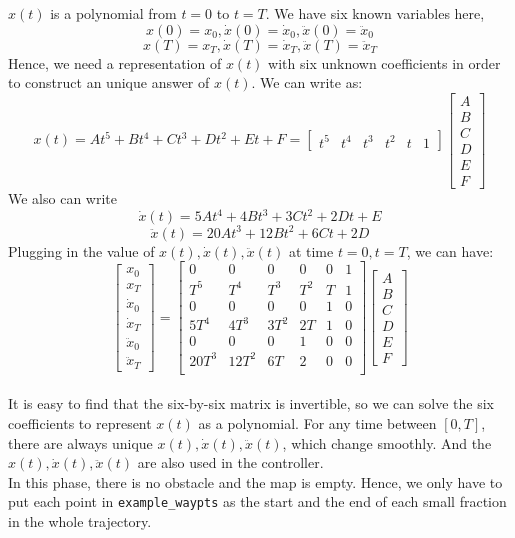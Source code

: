 $x(t)$ is a polynomial from $t = 0$ to $t = T$. We have six known variables here,\\
\[x(0) = x_0, \dot x (0) = \dot x_0, \ddot x(0) = \ddot x_0\]
\[x(T) = x_T, \dot x (T) = \dot x_T, \ddot x(T) = \ddot x_T\]
Hence, we need a representation of $x(t)$ with six unknown coefficients in order to construct an unique answer of $x(t)$. We can write as:
\[x(t)=At^5+Bt^4+Ct^3+Dt^2+Et+F =
\begin{bmatrix}
t^5 & t^4 & t^3 & t^2 &t & 1
\end{bmatrix}
\begin{bmatrix}
A\\B\\C\\D\\E\\F
\end{bmatrix}
\]
We also can write
\[\dot x(t)=5At^4+4Bt^3+3Ct^2+2Dt+E\]
\[\ddot x(t)=20At^3+12Bt^2+6Ct+2D\]
Plugging in the value of $x(t),\dot x(t), \ddot x(t)$ at time $t = 0, t= T$, we can have:
\[
\begin{bmatrix}
x_0\\x_T\\\dot x_0\\\dot x_T\\ \ddot x_0\\ \ddot x_T
\end{bmatrix}=
\begin{bmatrix}
0     &    0  &   0  &   0 & 0 & 1\\
T^5   &  T^4  & T^3  & T^2 & T & 1\\
0     &    0  &   0  &   0 & 1 & 0\\
5T^4  &  4T^3 & 3T^2 &  2T & 1 & 0\\
0     &    0  &   0  &   1 & 0 & 0\\
20T^3 & 12T^2 &  6T  &   2 & 0 & 0\\
\end{bmatrix}
\begin{bmatrix}
A\\B\\C\\D\\E\\F
\end{bmatrix}
\]\\

It is easy to find that the six-by-six matrix is invertible, so we can solve the six coefficients to represent $x(t)$ as a polynomial. For any time between $[0, T]$, there are always unique $x(t),\dot x(t), \ddot x(t)$, which change smoothly. And the $x(t),\dot x(t), \ddot x(t)$ are also used in the controller.\\

In this phase, there is no obstacle and the map is empty. Hence, we only have to put each point in \texttt{example\_waypts}  as the start and the end of each small fraction in the whole trajectory. 
